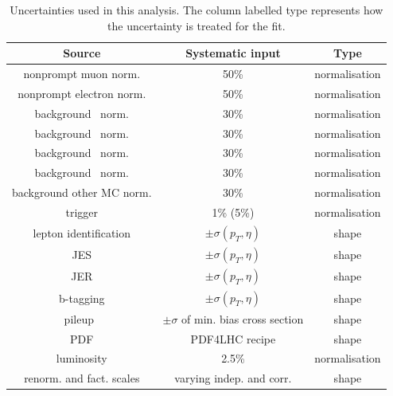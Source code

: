 \begin{table}[htbp]
	\centering
	\caption{Uncertainties used in this analysis. The column labelled type represents how the uncertainty is treated for the fit.}
	\begin{tabular}{ccc}
		\toprule
		Source & Systematic input & Type \\ 
		\midrule 
		nonprompt muon norm. & 50\% & normalisation \\ 
		 
		nonprompt electron norm. & 50\% & normalisation \\ 
		 
		background \ttZ\ norm. & 30\% & normalisation \\ 
		 
		background \WZ\ norm. & 30\% & normalisation \\ 
		 
		background \tZq\ norm. & 30\% & normalisation \\ 
		 
		background \ZZ\ norm.& 30\% & normalisation \\ 
		 
		background other MC norm. & 30\% & normalisation \\ 
		 
		trigger & 1\% (5\%) & normalisation \\ 
		 
		lepton identification  & $\pm \sigma(p_{T},\eta)$ & shape \\ 
		 
		JES & $\pm \sigma(p_{T},\eta)$ & shape \\ 
		 
		JER & $\pm \sigma(p_{T},\eta)$ &  shape \\ 
		 
		b-tagging & $\pm \sigma(p_{T},\eta)$ & shape \\ 
		 
		pileup\ & $\pm \sigma$ of min. bias cross section &  shape \\ 
		 
		PDF & PDF4LHC recipe &  shape   \\ 
		 
		luminosity & 2.5\% & normalisation \\ 
		 
		renorm. and fact. scales & varying indep. and corr. &  shape \\ 
		\bottomrule
	\end{tabular} 
	\label{tab:nuis}
\end{table}
\clearpage
